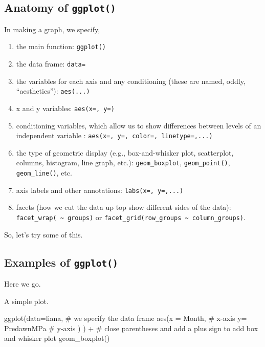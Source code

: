 \documentclass[
  letterpaper,
  DIV=11,
  numbers=noendperiod]{scrreprt}
\newenvironment{Shaded}{\begin{snugshade}}{\end{snugshade}}
\newcommand{\AttributeTok}[1]{\textcolor[rgb]{0.40,0.45,0.13}{#1}}
\newcommand{\CommentTok}[1]{\textcolor[rgb]{0.37,0.37,0.37}{#1}}
\newcommand{\FunctionTok}[1]{\textcolor[rgb]{0.28,0.35,0.67}{#1}}
\newcommand{\NormalTok}[1]{\textcolor[rgb]{0.00,0.23,0.31}{#1}}
\newcommand{\SpecialCharTok}[1]{\textcolor[rgb]{0.37,0.37,0.37}{#1}}
\providecommand{\tightlist}{%
  \setlength{\itemsep}{0pt}\setlength{\parskip}{0pt}}
\begin{document}
\subsection{\texorpdfstring{Anatomy of
\texttt{ggplot()}}{Anatomy of ggplot()}}\label{anatomy-of-ggplot}

In making a graph, we specify,

\begin{enumerate}
\def\labelenumi{\arabic{enumi}.}
\tightlist
\item
  the main function: \texttt{ggplot()}
\item
  the data frame: \texttt{data=}
\item
  the variables for each axis and any conditioning (these are named,
  oddly, ``aesthetics''): \texttt{aes(...)}
\item
  x and y variables: \texttt{aes(x=,\ y=)}
\item
  conditioning variables, which allow us to show differences between
  levels of an independent variable :
  \texttt{aes(x=,\ y=,\ color=,\ linetype=,...)}
\item
  the type of geometric display (e.g., box-and-whisker plot,
  scatterplot, columns, histogram, line graph, etc.):
  \texttt{geom\_boxplot}, \texttt{geom\_point()}, \texttt{geom\_line()},
  etc.
\item
  axis labels and other annotations: \texttt{labs(x=,\ y=,...)}
\item
  facets (how we cut the data up top show different sides of the data):
  \texttt{facet\_wrap(\ \textasciitilde{}\ groups)} or
  \texttt{facet\_grid(row\_groups\ \textasciitilde{}\ column\_groups)}.
\end{enumerate}

So, let's try some of this.

\subsection{\texorpdfstring{Examples of
\texttt{ggplot()}}{Examples of ggplot()}}\label{examples-of-ggplot}

Here we go.

A simple plot.

\begin{Shaded}
\begin{Highlighting}[]
\FunctionTok{ggplot}\NormalTok{(}\AttributeTok{data=}\NormalTok{liana, }\CommentTok{\# we specify the data frame}
      \FunctionTok{aes}\NormalTok{(}\AttributeTok{x =}\NormalTok{ Month, }\CommentTok{\# x{-}axis}
          \AttributeTok{y=}\NormalTok{ PredawnMPa }\CommentTok{\# y{-}axis}
\NormalTok{          ) ) }\SpecialCharTok{+} \CommentTok{\# close parentheses and add a plus sign to add box and whisker plot }
  \FunctionTok{geom\_boxplot}\NormalTok{() }
\end{Highlighting}
\end{Shaded}
\end{document}

